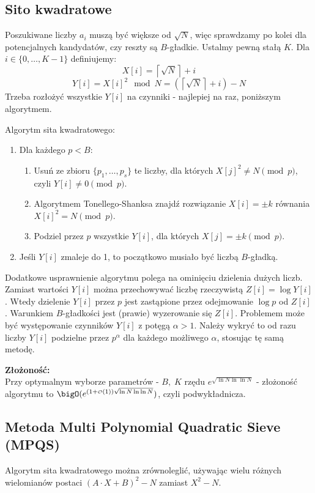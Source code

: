 \subsection{Sito kwadratowe}
Poszukiwane liczby \( a_i \) muszą być większe od \( \sqrt{N} \), więc sprawdzamy po kolei dla potencjalnych kandydatów, czy reszty są \( B \)-gładkie. Ustalmy pewną stałą \( K \). Dla \( i \in \{0, \dots, K-1\} \) definiujemy:
\[ X[i] = \left\lceil \sqrt{N} \right\rceil + i \]
\[ Y[i] = X[i]^2 \mod N = \left(\left\lceil \sqrt{N} \right\rceil + i\right) - N \]
Trzeba rozłożyć wszystkie \( Y[i] \) na czynniki - najlepiej na raz, poniższym algorytmem.
\begin{greyframe}
    Algorytm sita kwadratowego:
    \begin{enumerate}
        \item Dla każdego \( p < B \):
        \begin{enumerate}
            \item Usuń ze zbioru \( \{p_1, \dots, p_s\} \) te liczby, dla których \( X[j]^2 \neq N \pmod{p} \), \\ czyli \( Y[i] \neq 0 \pmod{p} \).
            \item Algorytmem Tonellego-Shanksa znajdź rozwiązanie \( X[i] = \pm k \) równania \\ \( X[i]^2 = N \pmod{p} \).
            \item Podziel przez \( p \) wszystkie \( Y[i] \), dla których \( X[j] = \pm k \pmod{p} \).
        \end{enumerate}
        \item Jeśli \( Y[i] \) zmaleje do 1, to początkowo musiało być liczbą \( B \)-gładką.
    \end{enumerate}
\end{greyframe}
Dodatkowe usprawnienie algorytmu polega na ominięciu dzielenia dużych liczb. Zamiast wartości \( Y[i] \) można przechowywać liczbę rzeczywistą \( Z[i] = \log Y[i] \). Wtedy dzielenie \( Y[i] \) przez \( p \) jest zastąpione przez odejmowanie \( \log p \) od \( Z[i] \). Warunkiem \( B \)-gładkości jest (prawie) wyzerowanie się \( Z[i] \).
Problemem może być występowanie czynników \( Y[i] \) z potęgą \( \alpha > 1 \). Należy wykryć to od razu liczby \( Y[i] \) podzielne przez \( p^{\alpha} \) dla każdego możliwego \( \alpha \), stosując tę samą metodę.

\textbf{Złożoność:} \\
Przy optymalnym wyborze parametrów - \( B,\; K \) rzędu \( e^{\sqrt{\ln N \ln\ln N}} \) - złożoność algorytmu to \( \bigO(e^{(1 + {\scriptscriptstyle\mathcal{O}}(1))\sqrt{\ln N \ln\ln N}}) \), czyli podwykładnicza.

\subsection{Metoda Multi Polynomial Quadratic Sieve (MPQS)}
Algorytm sita kwadratowego można zrównoleglić, używając wielu różnych wielomianów postaci \( (A \cdot X + B)^2 - N \) zamiast \( X^2 - N \).